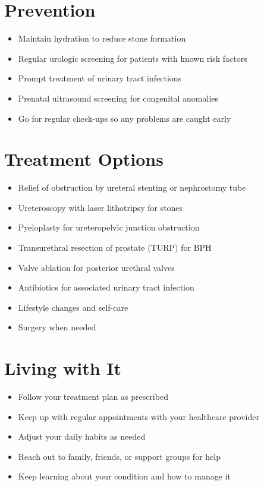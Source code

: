\section{Prevention}

\begin{itemize}[noitemsep]
  \item Maintain hydration to reduce stone formation
  \item Regular urologic screening for patients with known risk factors
  \item Prompt treatment of urinary tract infections
  \item Prenatal ultrasound screening for congenital anomalies
  \item Go for regular check-ups so any problems are caught early
\end{itemize}

\section{Treatment Options}

\begin{itemize}[noitemsep]
  \item Relief of obstruction by ureteral stenting or nephrostomy tube
  \item Ureteroscopy with laser lithotripsy for stones
  \item Pyeloplasty for ureteropelvic junction obstruction
  \item Transurethral resection of prostate (TURP) for BPH
  \item Valve ablation for posterior urethral valves
  \item Antibiotics for associated urinary tract infection
  \item Lifestyle changes and self-care
  \item Surgery when needed
\end{itemize}

\section{Living with It}

\begin{itemize}[noitemsep]
  \item Follow your treatment plan as prescribed
  \item Keep up with regular appointments with your healthcare provider
  \item Adjust your daily habits as needed
  \item Reach out to family, friends, or support groups for help
  \item Keep learning about your condition and how to manage it
\end{itemize}


